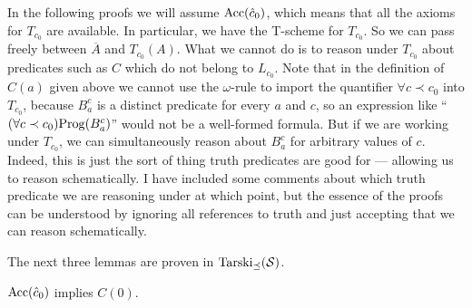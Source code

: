 \documentclass{amsart}
\begin{document}
In the following proofs we will assume ${\rm Acc}(\hat{c}_0)$, which means that all the axioms for
$T_{c_0}$ are available. In particular, we have the T-scheme for $T_{c_0}$. So we can pass freely
between $\overline{A}$ and $T_{c_0}(A)$. What we cannot do is to reason under $T_{c_0}$ about
predicates such as $C$ which do not belong to $L_{c_0}$. Note that in the definition of $C(a)$ given above
we cannot use the
$\omega$-rule to import the quantifier $\forall c \prec c_0$ into $T_{c_0}$, because $B_a^c$ is a
distinct predicate for every $a$ and $c$, so an expression like ``$(\forall c \prec c_0){\rm Prog}(B_a^c)$''
would not be a well-formed formula. But if we are working under $T_{c_0}$, we can simultaneously
reason about $B_a^c$ for arbitrary values of $c$. Indeed, this is just the sort of thing truth predicates
are good for --- allowing us to reason schematically. I have included some
comments about which truth predicate we are reasoning under at which point, but the
essence of the proofs can be understood by ignoring all references to truth and just accepting
that we can reason schematically.

The next three lemmas are proven in ${\rm Tarski}_{\preceq}(\mathcal{S})$.

\begin{lemma}\label{lemma1}
${\rm Acc}(\hat{c}_0)$ implies $C(0)$.
\end{lemma}
\end{document}
